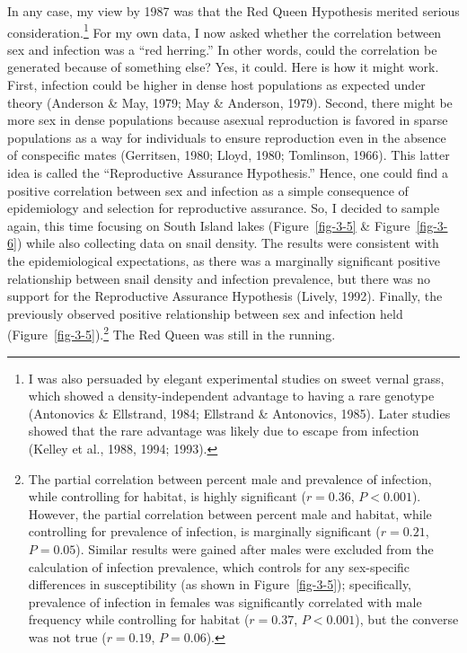 \documentclass[
  letterpaper,
]{book}
\begin{document}
In any case, my view by 1987 was that the Red Queen Hypothesis merited
serious consideration.\footnote{I was also persuaded by elegant
  experimental studies on sweet vernal grass, which showed a
  density-independent advantage to having a rare genotype (Antonovics \&
  Ellstrand, 1984; Ellstrand \& Antonovics, 1985). Later studies showed
  that the rare advantage was likely due to escape from infection
  (Kelley et al., 1988, 1994; 1993).} For my own data, I now asked
whether the correlation between sex and infection was a ``red herring.''
In other words, could the correlation be generated because of something
else? Yes, it could. Here is how it might work. First, infection could
be higher in dense host populations as expected under theory (Anderson
\& May, 1979; May \& Anderson, 1979). Second, there might be more sex in
dense populations because asexual reproduction is favored in sparse
populations as a way for individuals to ensure reproduction even in the
absence of conspecific mates (Gerritsen, 1980; Lloyd, 1980; Tomlinson,
1966). This latter idea is called the ``Reproductive Assurance
Hypothesis.'' Hence, one could find a positive correlation between sex
and infection as a simple consequence of epidemiology and selection for
reproductive assurance. So, I decided to sample again, this time
focusing on South Island lakes (Figure~\ref{fig-3-5} \&
Figure~\ref{fig-3-6}) while also collecting data on snail density. The
results were consistent with the epidemiological expectations, as there
was a marginally significant positive relationship between snail density
and infection prevalence, but there was no support for the Reproductive
Assurance Hypothesis (Lively, 1992). Finally, the previously observed
positive relationship between sex and infection held
(Figure~\ref{fig-3-5}).\footnote{The partial correlation between percent
  male and prevalence of infection, while controlling for habitat, is
  highly significant (\(r = 0.36\), \(P < 0.001\)). However, the partial
  correlation between percent male and habitat, while controlling for
  prevalence of infection, is marginally significant (\(r = 0.21\),
  \(P = 0.05\)). Similar results were gained after males were excluded
  from the calculation of infection prevalence, which controls for any
  sex-specific differences in susceptibility (as shown in
  Figure~\ref{fig-3-5}); specifically, prevalence of infection in
  females was significantly correlated with male frequency while
  controlling for habitat (\(r = 0.37\), \(P < 0.001\)), but the
  converse was not true (\(r = 0.19\), \(P = 0.06\)).} The Red Queen was
still in the running.
\end{document}
